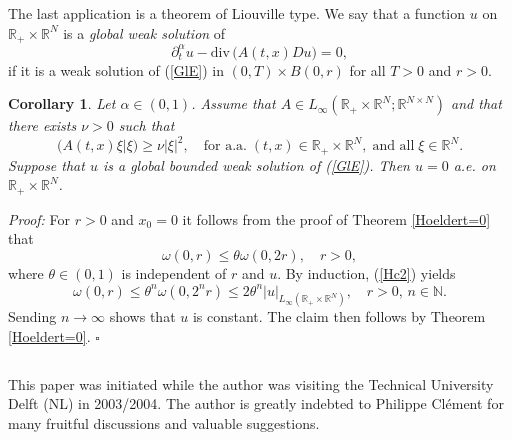 \documentclass[10pt]{article}
\newtheorem{korollar}{Corollary}[section]
\newcommand{\iR}{\mathbb{R}}
\newcommand{\iN}{\mathbb{N}}
\begin{document}
The last application is a theorem of Liouville type. We say that a
function $u$ on $\iR_+\times \iR^N$ is a {\em global weak solution}
of
\begin{equation} \label{GlE}
\partial_t^\alpha u-\mbox{div}\,\big(A(t,x)Du\big)=0,
\end{equation}
if it is a weak solution of (\ref{GlE}) in $(0,T)\times B(0,r)$ for
all $T>0$ and $r>0$.
\begin{korollar} \label{Liouville}
Let $\alpha\in(0,1)$. Assume that $A\in L_\infty(\iR_+\times
\iR^N;\iR^{N\times N})$ and that there exists $\nu>0$ such that
\[
\big(A(t,x)\xi|\xi\big)\ge \nu|\xi|^2,\quad\mbox{for a.a.}\;
(t,x)\in\iR_+\times \iR^N,\; \mbox{and all}\;\xi\in \iR^N.
\]
Suppose that $u$ is a global bounded weak solution of (\ref{GlE}).
Then $u=0$ a.e. on $\iR_+\times \iR^N$.
\end{korollar}
{\em Proof:} For $r>0$ and $x_0=0$ it follows from the proof of
Theorem \ref{Hoeldert=0} that
\begin{equation} \label{Hc2}
\omega(0,r)\le \theta \omega(0,2r),\quad r>0,
\end{equation}
where $\theta\in(0,1)$ is independent of $r$ and $u$. By induction,
(\ref{Hc2}) yields
\[
\omega(0,r)\le \theta^n \omega(0,2^nr)\le 2\theta^n
|u|_{L_\infty(\iR_+\times \iR^N)},\quad r>0,\,n\in\iN.
\]
Sending $n\to \infty$ shows that $u$ is constant. The claim then
follows by Theorem \ref{Hoeldert=0}. $\square$

$\mbox{}$

 This paper was initiated while the
author was visiting the Technical University Delft (NL) in
2003/2004. The author is greatly indebted to Philippe Cl\'ement for
many fruitful discussions and valuable suggestions.
\end{document}
